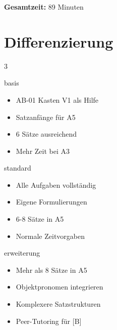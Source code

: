 \documentclass[11pt, a4paper]{article}
\begin{document}
\textbf{Gesamtzeit:} 89 Minuten


\section*{Differenzierung}

\begin{multicols}{3}

\begin{diffbox}[{[B] Basis}]{basis}
\footnotesize
\begin{itemize}[leftmargin=1em, itemsep=2pt]
    \item AB-01 Kasten V1 als Hilfe
    \item Satzanfänge für A5
    \item 6 Sätze ausreichend
    \item Mehr Zeit bei A3
\end{itemize}
\end{diffbox}

\columnbreak

\begin{diffbox}[{[S] Standard}]{standard}
\footnotesize
\begin{itemize}[leftmargin=1em, itemsep=2pt]
    \item Alle Aufgaben vollständig
    \item Eigene Formulierungen
    \item 6-8 Sätze in A5
    \item Normale Zeitvorgaben
\end{itemize}
\end{diffbox}

\columnbreak

\begin{diffbox}[{[E] Erweiterung}]{erweiterung}
\footnotesize
\begin{itemize}[leftmargin=1em, itemsep=2pt]
    \item Mehr als 8 Sätze in A5
    \item Objektpronomen integrieren
    \item Komplexere Satzstrukturen
    \item Peer-Tutoring für [B]
\end{itemize}
\end{diffbox}

\end{multicols}
\end{document}
